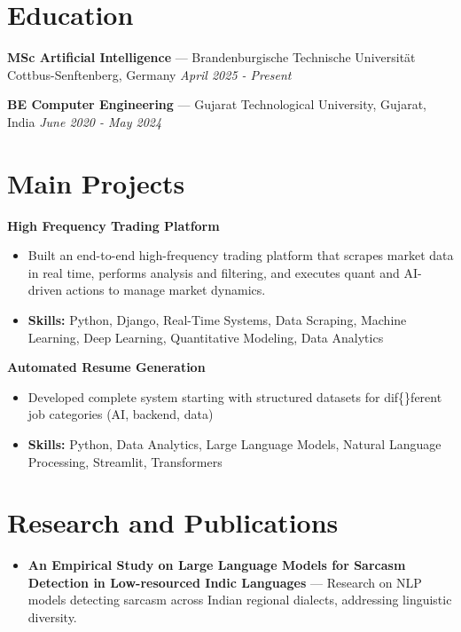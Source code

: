 \documentclass[a4paper,10pt]{article}
\begin{document}
\section*{Education}
\textbf{MSc Artificial Intelligence} — Brandenburgische Technische Universität Cottbus-Senftenberg, Germany \hfill \textit{April 2025 - Present}\par
\vspace{1.5pt}
\textbf{BE Computer Engineering} — Gujarat Technological University, Gujarat, India \hfill \textit{June 2020 - May 2024}\par

\section*{Main Projects}
\textbf{High Frequency Trading Platform}\par
\vspace{1pt}
\begin{itemize}
  \item Built an end-to-end high-frequency trading platform that scrapes market data in real time, performs analysis and filtering, and executes quant and AI-driven actions to manage market dynamics.
  \item \textbf{Skills:} Python, Django, Real-Time Systems, Data Scraping, Machine Learning, Deep Learning, Quantitative Modeling, Data Analytics
\end{itemize}
\vspace{3pt}
\textbf{Automated Resume Generation}\par
\vspace{1pt}
\begin{itemize}
  \item Developed complete system starting with structured datasets for dif\{\}ferent job categories (AI, backend, data)
  \item \textbf{Skills:} Python, Data Analytics, Large Language Models, Natural Language Processing, Streamlit, Transformers
\end{itemize}

\section*{Research and Publications}
\begin{itemize}
\item \textbf{An Empirical Study on Large Language Models for Sarcasm Detection in Low-resourced Indic Languages} — Research on NLP models detecting sarcasm across Indian regional dialects, addressing linguistic diversity.
\end{itemize}
\end{document}
